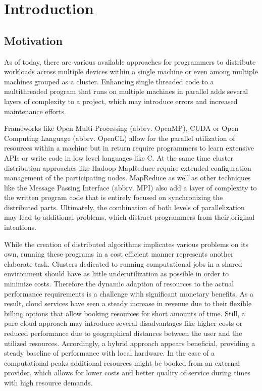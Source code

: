 \chapter{Introduction}

\section{Motivation}

As of today, there are various available approaches for programmers to distribute workloads across multiple devices within a single machine or even among multiple machines grouped as a cluster. Enhancing single threaded code to a multithreaded program that runs on multiple machines in parallel adds several layers of complexity to a project, which may introduce errors and increased maintenance efforts.

Frameworks like Open Multi-Processing (abbrv. OpenMP), CUDA or Open Computing Language (abbrv. OpenCL) allow for the parallel utilization of resources within a machine but in return require programmers to learn extensive APIs or write code in low level languages like C.
At the same time cluster distribution approaches like Hadoop MapReduce require extended configuration management of the participating nodes. MapReduce as well as other techniques like the Message Passing Interface (abbrv. MPI) also add a layer of complexity to the written program code that is entirely focused on synchronizing the distributed parts.
Ultimately, the combination of both levels of parallelization may lead to additional problems, which distract programmers from their original intentions.

While the creation of distributed algorithms implicates various problems on its own, running these programs in a cost efficient manner represents another elaborate task. Clusters dedicated to running computational jobs in a shared environment should have as little underutilization as possible in order to minimize costs. Therefore the dynamic adaption of resources to the actual performance requirements is a challenge with significant monetary benefits. As a result, cloud services have seen a steady increase in revenue due to their flexible billing options that allow booking resources for short amounts of time. Still, a pure cloud approach may introduce several disadvantages like higher costs or reduced performance due to geographical distances between the user and the utilized resources. Accordingly, a hybrid approach appears beneficial, providing a steady baseline of performance with local hardware. In the case of a computational peaks additional resources might be booked from an external provider, which allows for lower costs and better quality of service during times with high resource demands.

